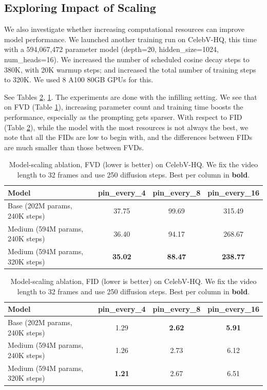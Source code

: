 \subsection{Exploring Impact of Scaling}

We also investigate whether increasing computational resources can improve model performance.
We launched another training run on CelebV-HQ, this time with a 594,067,472 parameter model (depth=20, hidden\_size=1024, num\_heads=16). We increased the number of scheduled cosine decay steps to 380K, with 20K warmup steps; and increased the total number of training steps to 320K. We used 8 A100 80GB GPUs for this.

See Tables \ref{tab:scaling_ablation_fid_score}, \ref{tab:scaling_ablation_fvd_score}.
The experiments are done with the infilling setting. We see that on FVD (Table \ref{tab:scaling_ablation_fvd_score}), increasing parameter count and training time boosts the performance, especially as the prompting gets sparser. With respect to FID (Table \ref{tab:scaling_ablation_fid_score}), while the model with the most resources is not always the best, we note that all the FIDs are low to begin with, and the differences between FIDs are much smaller than those between FVDs.

\begin{table}[h]
\centering
\caption{Model-scaling ablation, FVD (lower is better) on CelebV-HQ. We fix the video length to 32 frames and use 250 diffusion steps. Best per column in \textbf{bold}.}
\label{tab:scaling_ablation_fvd_score}
\begin{tabular}{lccc}
\toprule
Model & pin\_every\_4 & pin\_every\_8 & pin\_every\_16 \\
\midrule
Base (202M params, 240K steps) & 37.75 & 99.69 & 315.49 \\
Medium (594M params, 240K steps) & 36.40 & 94.17 & 268.67 \\
Medium (594M params, 320K steps) & \textbf{35.02} & \textbf{88.47} & \textbf{238.77} \\
\bottomrule
\end{tabular}
\end{table}

\begin{table}[h]
\centering
\caption{Model-scaling ablation, FID (lower is better) on CelebV-HQ. We fix the video length to 32 frames and use 250 diffusion steps. Best per column in \textbf{bold}.}
\label{tab:scaling_ablation_fid_score}
\begin{tabular}{lccc}
\toprule
Model & pin\_every\_4 & pin\_every\_8 & pin\_every\_16 \\
\midrule
Base (202M params, 240K steps) & 1.29 & \textbf{2.62} & \textbf{5.91} \\
Medium (594M params, 240K steps) & 1.26 & 2.73 & 6.12 \\
Medium (594M params, 320K steps) & \textbf{1.21} & 2.67 & 6.51 \\
\bottomrule
\end{tabular}
\end{table}
